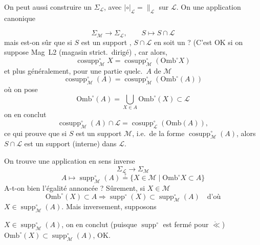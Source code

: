 \documentclass[11pt,a4paper]{article}
\begin{document}
On peut aussi construire un  $\Sigma_{\mathcal{L}}$, avec $\mathrel{|\circ|}_{\mathcal{L}} = \parallel_{\mathcal{L}}$ sur $\mathcal{L}$. On \struck{\ill{}}  une application canonique

\[
  \Sigma_{\mathcal{M}} \longrightarrow \Sigma_{\mathcal{L}}, \qquad S \longmapsto S \cap \mathcal{L}
\]
mais est-on sûr que si $S$ est un support , $S \cap \mathcal{L}$ en soit un ? (C'est OK si on suppose Mag~L2 \struck{\ill{}} (magasin strict.\ dirigé) \struck{\ill{}}, car alors,
\[
  \operatorname{cosupp}^{\circ}_{\mathcal{M}} X = \operatorname{cosupp}^{\circ}_{\mathcal{M}}(\mathrm{Omb}^{\circ} X)
\]
et plus généralement, pour une partie quelc.\ $A$ de $\mathcal{M}$
\[
  \operatorname{cosupp}^{\circ}_{\mathcal{M}}(A) = \operatorname{cosupp}^{\circ}_{\mathcal{M}}(\mathrm{Omb}^{\circ}(A))
\]
où on pose
\[
  \mathrm{Omb}^{\circ}(A) = \bigcup_{X \in A} \mathrm{Omb}^{\circ}(X) \subset \mathcal{L}
\]
on en conclut
\[
  \operatorname{cosupp}^{\circ}_{\mathcal{M}}(A) \cap \mathcal{L} = \operatorname{cosupp}^{\circ}_{\mathcal{L}}(\mathrm{Omb}(A)),
\]
 ce qui prouve que si $S$ est un support  \struck{\ill{}}  $\mathcal{M}$, i.e.\ de la forme $\operatorname{cosupp}^{\circ}_{\mathcal{M}}(A)$, alors $S \cap \mathcal{L}$ est un support (interne) dans $\mathcal{L}$.

On trouve une application en sens inverse
\[
  \Sigma_{\mathcal{L}} \longrightarrow \Sigma_{\mathcal{M}}
\]
\[
  A \longmapsto \operatorname{supp}^{\circ}_{\mathcal{M}}(A) \overset{?}{=} \{ X \in \mathcal{M} \mid \mathrm{Omb}^{\circ} X \subset A \}
\]
A-t-on bien l'égalité annoncée ? Sûrement, si $X \in \mathcal{M}$
\[
  \mathrm{Omb}^{\circ}(X) \subset A \Longrightarrow \operatorname{supp}^{\circ}(X) \subset \operatorname{supp}^{\circ}_{\mathcal{M}}(A) \quad \text{d'où}
\]
$X \in \operatorname{supp}^{\circ}_{\mathcal{M}}(A)$. Mais inversement, supposons

$X \in \operatorname{supp}^{\circ}_{\mathcal{M}}(A)$, on en conclut (puisque $\operatorname{supp}^{\circ}$ est fermé pour $\mathrel{\mathring{\ll}}$) $\mathrm{Omb}^{\circ}(X) \subset \operatorname{supp}^{\circ}_{\mathcal{M}}(A)$, OK.
\end{document}
